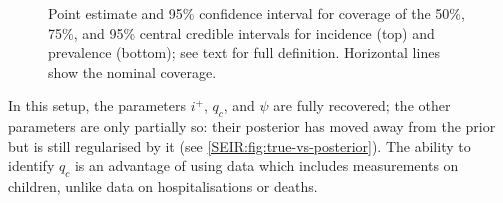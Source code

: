 \documentclass[thesis.tex]{subfiles}
\begin{document}
\begin{figure}
    \vspace{-3cm}
    \caption[Coverage of simulation study (derived quantities)]{%
        Point estimate and 95\% confidence interval for coverage of the 50\%, 75\%, and 95\% central credible intervals for incidence (top) and prevalence (bottom); see text for full definition.
        Horizontal lines show the nominal coverage.
    }
    \label{SEIR:fig:sim-inc-prev}
\end{figure}


In this setup, the parameters $i^+$, $q_c$, and $\psi$ are fully recovered; the other parameters are only partially so: their posterior has moved away from the prior but is still regularised by it (see \cref{SEIR:fig:true-vs-posterior}).
The ability to identify $q_c$ is an advantage of using data which includes measurements on children, unlike data on hospitalisations or deaths.
\end{document}
